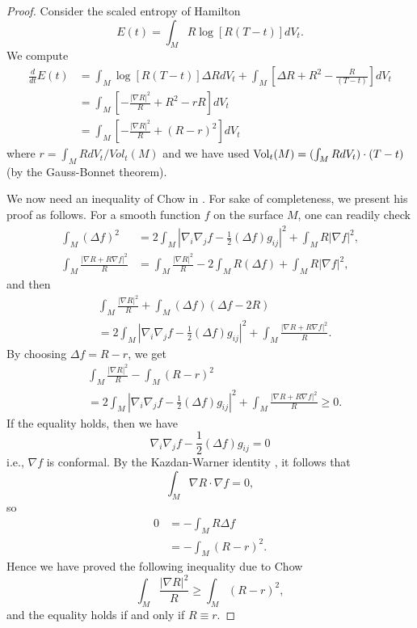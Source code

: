 \begin{proof}
Consider the scaled entropy of Hamilton \cite{Ha88}
$$
E(t)=\int_MR\log[R(T-t)]dV_t.
$$
We compute
\begin{align}
\frac{d}{dt}E(t)&  = \int_M \log[R(T-t)]\Delta
RdV_t+\int_M\left[\Delta R+R^2-\frac{R}{(T-t)}\right]dV_t\\
&  = \int_M\left[-\frac{|\nabla R|^2}{R}+R^2-rR\right]dV_t \nonumber\\
&  = \int_M\left[-\frac{|\nabla R|^2}{R}+(R-r)^2\right]dV_t \nonumber
\end{align}  %
where $r=\int_MRdV_t/Vol_t(M)$ and we have used
$\operatorname{Vol}_t(M)=(\int_MRdV_t)\cdot(T-t)$ (by the Gauss-Bonnet theorem).

We now need an inequality of Chow in \cite{ChowE}. For sake of
completeness, we present his proof as follows. For a smooth function
$f$ on the surface $M$, one can readily check
\begin{align*}
\int_M(\Delta f)^2 &=2\int_M\left|\nabla_i\nabla_j
f-\frac{1}{2}(\Delta f)g_{ij}\right|^2
+\int_MR|\nabla f|^2, \\
\int_M\frac{|\nabla R+R\nabla f|^2}{R} &=\int_M\frac{|\nabla
R|^2}{R}-2\int_M R(\Delta f)+\int_MR|\nabla f|^2,
\end{align*}
and then
\begin{align*}
&\int_M\frac{|\nabla R|^2}{R}+\int_M(\Delta f)(\Delta f-2R)\\
&=2\int_M\left|\nabla_i\nabla_jf-\frac{1}{2}(\Delta
f)g_{ij}\right|^2 +\int_M\frac{|\nabla R+R\nabla f|^2}{R}.
\end{align*}
By choosing $\Delta f=R-r$, we get
\begin{align*}
&\int_M\frac{|\nabla R|^2}{R}-\int_M(R-r)^2 \\
&=2\int_M\left|\nabla_i\nabla_jf-\frac{1}{2}(\Delta
f)g_{ij}\right|^2 +\int_M\frac{|\nabla R+R\nabla f|^2}{R}\ge 0.
\end{align*}
If the equality holds, then we have
$$
\nabla_i\nabla_jf-\frac{1}{2}(\Delta f)g_{ij}=0
$$
i.e., $\nabla f$ is conformal. By the Kazdan-Warner identity
\cite{KW}, it follows that
$$
\int_M\nabla R\cdot \nabla f=0,
$$
so
\begin{align*}
0&  = -\int_MR\Delta f\\
&  = -\int_M(R-r)^2.
\end{align*}
Hence we have proved the following inequality due to Chow
\cite{ChowE} \begin{equation} \int_M\frac{|\nabla R|^2}{R}\ge\int_M(R-r)^2,
\end{equation} and the equality holds if and only if $R\equiv r$.


\end{proof}
